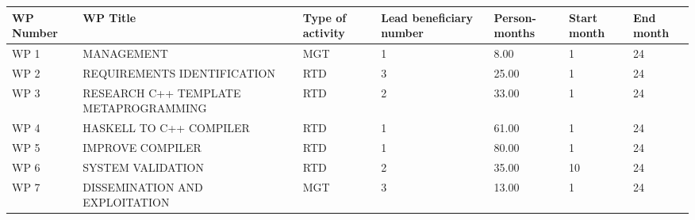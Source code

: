 \documentclass{article}
\begin{document}
\begin{center}
	\begin{tabular}{ |p{1cm}|p{2.8cm}|p{1cm}|p{1cm}|p{1cm}|p{0.8cm}|p{0.8cm}| }
		\hline
		WP Number & WP Title & Type of activity & Lead beneficiary number & Person-months & Start month & End month \\ \hline
		WP 1 & MANAGEMENT & MGT & 1 & 8.00 & 1 & 24 \\ \hline
		WP 2 & REQUIREMENTS IDENTIFICATION & RTD & 3 & 25.00 & 1 & 24 \\ \hline
		WP 3 & RESEARCH C++ TEMPLATE METAPROGRAMMING & RTD & 2 & 33.00 & 1 & 24 \\ \hline
		WP 4 & HASKELL TO C++ COMPILER & RTD & 1 & 61.00 & 1 & 24 \\ \hline
		WP 5 & IMPROVE COMPILER & RTD & 1& 80.00 & 1 & 24 \\ \hline
		WP 6 & SYSTEM VALIDATION & RTD & 2 & 35.00 & 10 & 24 \\ \hline
		WP 7 & DISSEMINATION AND EXPLOITATION & MGT & 3 & 13.00 & 1 & 24 \\ \hline
	\end{tabular}
\end{center}

\newpage
\end{document}
